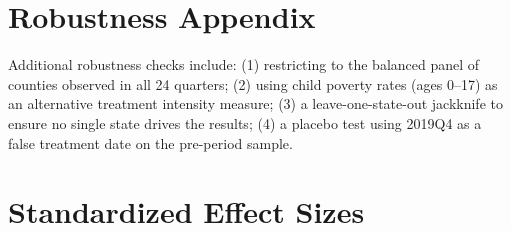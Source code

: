 \documentclass[12pt]{article}
\begin{document}
\section{Robustness Appendix}

Additional robustness checks include: (1) restricting to the balanced panel of counties observed in all 24 quarters; (2) using child poverty rates (ages 0--17) as an alternative treatment intensity measure; (3) a leave-one-state-out jackknife to ensure no single state drives the results; (4) a placebo test using 2019Q4 as a false treatment date on the pre-period sample.

\section{Standardized Effect Sizes}
\label{sec:sde}


\end{document}
